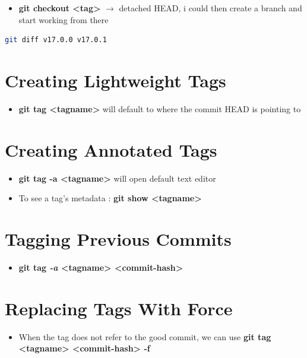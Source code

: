 \documentclass{report}
\begin{document}
\begin{itemize}
	\item \textbf{git checkout <tag>} $\rightarrow$ detached HEAD, i could then create a branch and start working from there
\end{itemize}

\begin{tcolorbox}[title=Diffing between two tags,colback=backcolour]
\begin{lstlisting}[language=bash]
git diff v17.0.0 v17.0.1
\end{lstlisting}
\end{tcolorbox}


\section{Creating Lightweight Tags}

\begin{itemize}
	\item \textbf{git tag <tagname>} will default to where the commit HEAD is pointing to
\end{itemize}


\section{Creating Annotated Tags}

\begin{itemize}
	\item \textbf{git tag -a <tagname>} will open default text editor 
	\item To see a tag's metadata : \textbf{git show <tagname>} 
\end{itemize}


\section{Tagging Previous Commits}

\begin{itemize}
	\item \textbf{git tag \textit{-a} <tagname> <commit-hash>} 
\end{itemize}


\section{Replacing Tags With Force}

\begin{itemize}
	\item When the tag does not refer to the good commit, we can use \textbf{git tag <tagname> <commit-hash> -f} 
\end{itemize}
\end{document}
